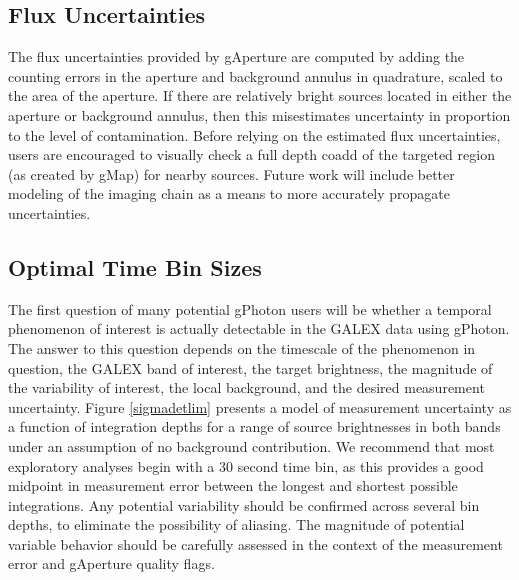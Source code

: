 \documentclass[preprint]{aastex}
\begin{document}
\subsection{Flux Uncertainties}
\label{fluxuncert}
The flux uncertainties provided by gAperture are computed by adding the counting errors in the aperture and background annulus in quadrature, scaled to the area of the aperture. If there are relatively bright sources located in either the aperture or background annulus, then this misestimates uncertainty in proportion to the level of contamination. Before relying on the estimated flux uncertainties, users are encouraged to visually check a full depth coadd of the targeted region (as created by gMap) for nearby sources. Future work will include better modeling of the imaging chain as a means to more accurately propagate uncertainties.

\subsection{Optimal Time Bin Sizes}
\label{optbinsize}
The first question of many potential gPhoton users will be whether a temporal phenomenon of interest is actually detectable in the GALEX data using gPhoton. The answer to this question depends on the timescale of the phenomenon in question, the GALEX band of interest, the target brightness, the magnitude of the variability of interest, the local background, and the desired measurement uncertainty. Figure \ref{sigmadetlim} presents a model of measurement uncertainty as a function of integration depths for a range of source brightnesses in both bands under an assumption of no background contribution. We recommend that most exploratory analyses begin with a 30 second time bin, as this provides a good midpoint in measurement error between the longest and shortest possible integrations. Any potential variability should be confirmed across several bin depths, to eliminate the possibility of aliasing. The magnitude of potential variable behavior should be carefully assessed in the context of the measurement error and gAperture quality flags.
\end{document}
